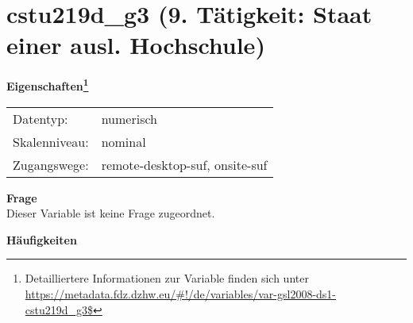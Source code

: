
    \setcounter{footnote}{0}

    \vspace*{-1.8cm}
	\section{cstu219d\_g3 (9. Tätigkeit: Staat einer ausl. Hochschule)}
	\label{section:cstu219d_g3}



    \vspace*{0.5cm}
    \noindent\textbf{Eigenschaften\footnote{Detailliertere Informationen zur Variable finden sich unter
		\url{https://metadata.fdz.dzhw.eu/\#!/de/variables/var-gsl2008-ds1-cstu219d_g3$}}}\\
	\begin{tabularx}{\hsize}{@{}lX}
	Datentyp: & numerisch \\
	Skalenniveau: & nominal \\
	Zugangswege: &
	  remote-desktop-suf, 
	  onsite-suf
 \\
    \end{tabularx}



		\vspace*{0.5cm}
		\noindent\textbf{Frage}\\
		Dieser Variable ist keine Frage zugeordnet.





        		\vspace*{0.5cm}
                \noindent\textbf{Häufigkeiten}

